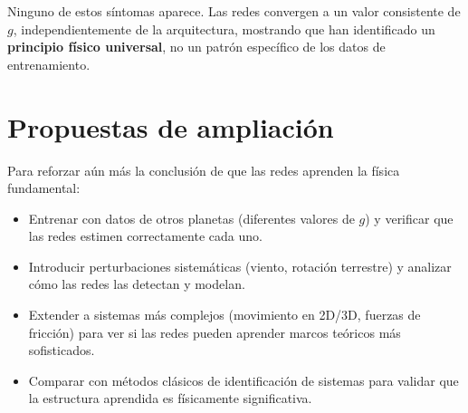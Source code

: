 \documentclass[11pt]{article}
\begin{document}
Ninguno de estos síntomas aparece. Las redes convergen a un valor consistente de $g$, independientemente de la arquitectura, mostrando que han identificado un \textbf{principio físico universal}, no un patrón específico de los datos de entrenamiento.

\section{Propuestas de ampliación}
Para reforzar aún más la conclusión de que las redes aprenden la física fundamental:
\begin{itemize}
    \item Entrenar con datos de otros planetas (diferentes valores de $g$) y verificar que las redes estimen correctamente cada uno.
    \item Introducir perturbaciones sistemáticas (viento, rotación terrestre) y analizar cómo las redes las detectan y modelan.
    \item Extender a sistemas más complejos (movimiento en 2D/3D, fuerzas de fricción) para ver si las redes pueden aprender marcos teóricos más sofisticados.
    \item Comparar con métodos clásicos de identificación de sistemas para validar que la estructura aprendida es físicamente significativa.
\end{itemize}
\end{document}
